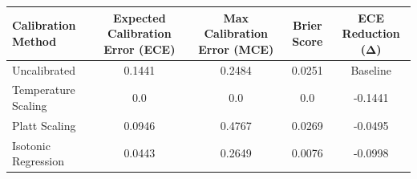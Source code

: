 \begin{tabular}{lcccc}
\hline
Calibration Method & Expected Calibration Error (ECE) & Max Calibration Error (MCE) & Brier Score & ECE Reduction (Δ) \\
\hline
Uncalibrated & 0.1441 & 0.2484 & 0.0251 & Baseline \\
Temperature Scaling & 0.0 & 0.0 & 0.0 & -0.1441 \\
Platt Scaling & 0.0946 & 0.4767 & 0.0269 & -0.0495 \\
Isotonic Regression & 0.0443 & 0.2649 & 0.0076 & -0.0998 \\
\hline
\end{tabular}
